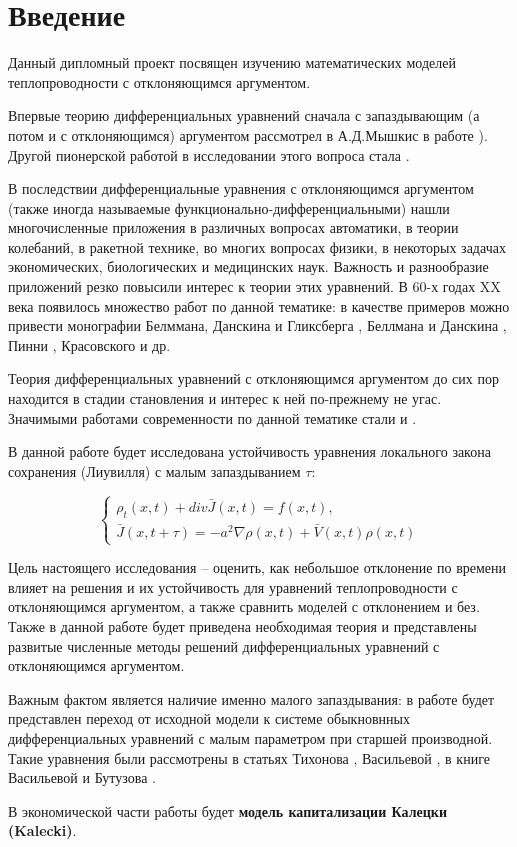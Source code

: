 \section*{Введение}

Данный дипломный проект посвящен изучению математических моделей теплопроводности с отклоняющимся аргументом. 

Впервые теорию дифференциальных уравнений сначала с запаздывающим (а потом и с отклоняющимся) аргументом рассмотрел в А.Д.Мышкис в работе \cite{bib:Myshkis-main}). Другой пионерской работой в исследовании этого вопроса стала \cite{bib:Hahn}.

В последствии дифференциальные уравнения с отклоняющимся аргументом (также иногда называемые функционально-дифференциальными) нашли многочисленные приложения в различных вопросах автоматики, в теории колебаний, в ракетной технике, во многих вопросах физики, в некоторых задачах экономических, биологических и медицинских наук. Важность и разнообразие приложений резко повысили интерес к теории этих уравнений. В 60-х годах XX века появилось множество работ по данной тематике: в качестве примеров можно привести монографии Белммана, Данскина и Гликсберга \cite{bib:Bellman-co}, Беллмана и Данскина \cite{bib:Bellman-Danskin}, Пинни \cite{bib:Pinny}, Красовского \cite{bib:Krasovskii} и др.

Теория дифференциальных уравнений с отклоняющимся аргументом до сих пор находится в стадии становления и интерес к ней по-прежнему не угас. Значимыми работами современности по данной тематике стали \cite{bib:Wu} и \cite{bib:Kolmanovskii-Myshkis}.

В данной работе будет исследована устойчивость уравнения локального закона сохранения (Лиувилля) с малым запаздыванием $\tau$:

\begin{equation*}
\left\{
\begin{aligned}
\rho_t(x,t) + div \bar{J}(x,t) = f(x,t),\\
\bar{J}(x,t+\tau) = -a^2 \nabla \rho(x,t) + \bar{V}(x,t) \rho(x,t)
\end{aligned}
\right.
\end{equation*}

Цель настоящего исследования \--- оценить, как небольшое отклонение по времени влияет на решения и их устойчивость для уравнений теплопроводности с отклоняющимся аргументом, а также сравнить моделей с отклонением и без. Также в данной работе будет приведена необходимая теория и представлены развитые численные методы решений дифференциальных уравнений с отклоняющимся аргументом.

Важным фактом является наличие именно малого запаздывания: в работе будет представлен переход от исходной модели к системе обыкновнных дифференциальных уравнений с малым параметром при старшей производной. Такие уравнения были рассмотрены в статьях Тихонова \cite{bib:Tikhonov_1, bib:Tikhonov_2}, Васильевой \cite{bib:Vasilieva}, в книге Васильевой и Бутузова \cite{bib:Vasilieva-Butuzov}.

В экономической части работы будет \textbf{модель капитализации Калецки (Kalecki)}\cite{bib:Black-Scholes}.